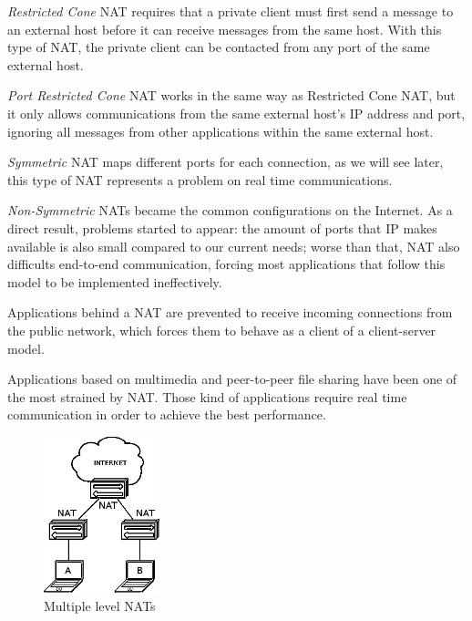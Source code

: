 \emph{Restricted Cone} \ac{NAT} requires that a private client must first send a message to an external host before it can receive messages from the same host. With this type of \ac{NAT}, the private client can be contacted from any port of the same external host.

\emph{Port Restricted Cone} \ac{NAT} works in the same way as Restricted Cone \ac{NAT}, but it only allows communications from the same external host's IP address and port, ignoring all messages from other applications within the same external host.

\emph{Symmetric} NAT maps different ports for each connection, as we will see later, this type of \ac{NAT} represents a problem on real time communications.

\emph{Non-Symmetric} \ac{NAT}s became the common configurations on the Internet. As a direct result, problems started to appear: the amount of ports that \ac{IP} makes available is also small compared to our current needs; worse than that, \ac{NAT} also difficults end-to-end communication, forcing most applications that follow this model to be implemented ineffectively.

Applications behind a \ac{NAT} are prevented to receive incoming connections from the public network, which forces them to behave as a client of a client-server model. 


Applications based on multimedia and peer-to-peer file sharing have been one of the most strained by \ac{NAT}. Those kind of applications require real time communication in order to achieve the best performance.

\begin{figure}[H]
	\centering
	\includegraphics[width=0.30\textwidth]{figures/multinat.png}
	\caption{Multiple level \ac{NAT}s}
\end{figure}

